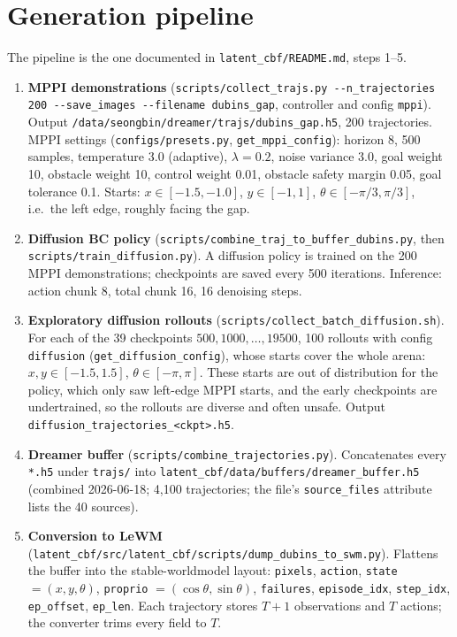 \documentclass[11pt]{article}
\newcommand{\file}[1]{\nolinkurl{#1}}
\begin{document}
\section{Generation pipeline}

The pipeline is the one documented in \file{latent_cbf/README.md}, steps 1--5.

\begin{enumerate}
\item \textbf{MPPI demonstrations} (\file{scripts/collect_trajs.py --n_trajectories 200 --save_images --filename dubins_gap}, controller and config \file{mppi}). Output \file{/data/seongbin/dreamer/trajs/dubins_gap.h5}, 200 trajectories. MPPI settings (\file{configs/presets.py}, \file{get_mppi_config}): horizon 8, 500 samples, temperature 3.0 (adaptive), $\lambda = 0.2$, noise variance 3.0, goal weight 10, obstacle weight 10, control weight 0.01, obstacle safety margin 0.05, goal tolerance 0.1. Starts: $x \in [-1.5, -1.0]$, $y \in [-1, 1]$, $\theta \in [-\pi/3, \pi/3]$, i.e.\ the left edge, roughly facing the gap.
\item \textbf{Diffusion BC policy} (\file{scripts/combine_traj_to_buffer_dubins.py}, then \file{scripts/train_diffusion.py}). A diffusion policy is trained on the 200 MPPI demonstrations; checkpoints are saved every 500 iterations. Inference: action chunk 8, total chunk 16, 16 denoising steps.
\item \textbf{Exploratory diffusion rollouts} (\file{scripts/collect_batch_diffusion.sh}). For each of the 39 checkpoints $500, 1000, \dots, 19500$, 100 rollouts with config \file{diffusion} (\file{get_diffusion_config}), whose starts cover the whole arena: $x, y \in [-1.5, 1.5]$, $\theta \in [-\pi, \pi]$. These starts are out of distribution for the policy, which only saw left-edge MPPI starts, and the early checkpoints are undertrained, so the rollouts are diverse and often unsafe. Output \file{diffusion_trajectories_<ckpt>.h5}.
\item \textbf{Dreamer buffer} (\file{scripts/combine_trajectories.py}). Concatenates every \file{*.h5} under \file{trajs/} into \file{latent_cbf/data/buffers/dreamer_buffer.h5} (combined 2026-06-18; 4{,}100 trajectories; the file's \file{source_files} attribute lists the 40 sources).
\item \textbf{Conversion to LeWM} (\file{latent_cbf/src/latent_cbf/scripts/dump_dubins_to_swm.py}). Flattens the buffer into the stable-worldmodel layout: \file{pixels}, \file{action}, \file{state} $= (x, y, \theta)$, \file{proprio} $= (\cos\theta, \sin\theta)$, \file{failures}, \file{episode_idx}, \file{step_idx}, \file{ep_offset}, \file{ep_len}. Each trajectory stores $T{+}1$ observations and $T$ actions; the converter trims every field to $T$.
\end{enumerate}
\end{document}
